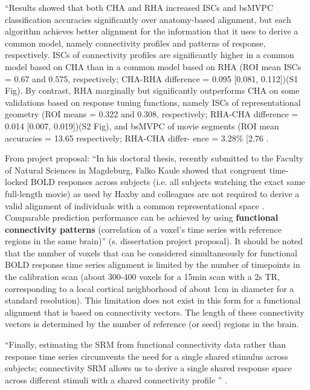 %
``Results showed that both CHA and RHA increased ISCs and bsMVPC classification
accuracies significantly over anatomy-based alignment, but each algorithm
achieves better alignment for the information that it uses to derive a common
model, namely connectivity profiles and patterns of response, respectively. ISCs
of connectivity profiles are significantly higher in a common model based on CHA
than in a common model based on RHA (ROI mean ISCs = 0.67 and 0.575,
respectively; CHA-RHA difference = 0.095 [0.081, 0.112])(S1 Fig). By contrast,
RHA marginally but significantly outperforms CHA on some validations based on
response tuning functions, namely ISCs of representational geometry (ROI means =
0.322 and 0.308, respectively; RHA-CHA difference = 0.014 [0.007, 0.019])(S2
Fig), and bsMVPC of movie segments (ROI mean accuracies = 13.65%
respectively; RHA-CHA differ- ence = 3.28\% [2.76%
\citep{guntupalli2018computational}.

From project proposal: ``In his doctoral thesis, recently submitted to the
Faculty of Natural Sciences in Magdeburg, Falko Kaule showed that congruent
time-locked BOLD responses across subjects (i.e. all subjects watching the exact
same full-length movie) as used by Haxby and colleagues are not required to
derive a valid alignment of individuals with a common representational space
\citep{kaule2017examination}.
%
Comparable prediction performance can be achieved by using \textbf{functional
connectivity patterns} (correlation of a voxel's time series with reference
regions in the same brain)'' (s. dissertation project proposal).
%
It should be noted that the number of voxels that can be considered
simultaneously for functional BOLD response time series alignment is limited by
the number of timepoints in the calibration scan (about 300-400 voxels for a
15min scan with a 2s TR, corresponding to a local cortical neighborhood of about
1cm in diameter for a standard resolution).
%
This limitation does not exist in this form for a functional alignment that is
based on connectivity vectors.
%
The length of these connectivity vectors is determined by the number of
reference (or seed) regions in the brain.


``Finally, estimating the SRM from functional connectivity
data rather than response time series circumvents the need for a single shared
stimulus across subjects; connectivity SRM allows us to derive a single shared
response space across different stimuli with a shared connectivity profile
\citep{nastase2019leveraging}'' \citep{kumar2020brainiak}.



